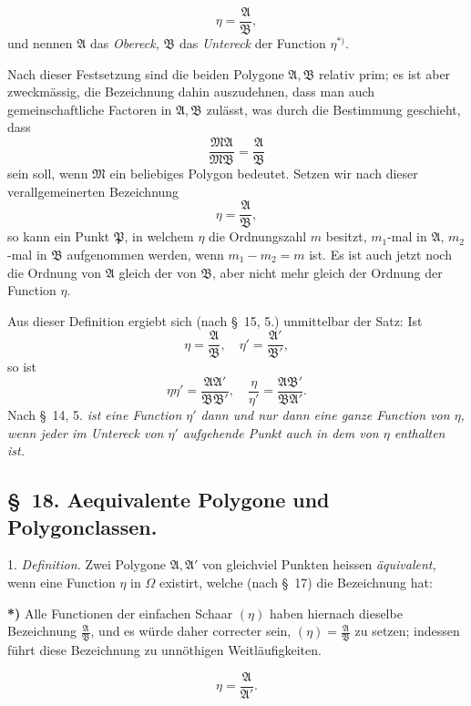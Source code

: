 \documentclass{article}
\begin{document}
\[ \eta = \frac{\mathfrak{A}}{\mathfrak{B}}, \]
und nennen $\mathfrak{A}$ das \emph{Obereck,} $\mathfrak{B}$ das \emph{Untereck} der Function $\eta{}^{*)}$.

Nach dieser Festsetzung sind die beiden Polygone $\mathfrak{A}, \mathfrak{B}$ relativ prim; es ist aber zweckmässig, die Bezeichnung dahin auszudehnen, dass man auch gemeinschaftliche Factoren in $\mathfrak{A}, \mathfrak{B}$ zulässt, was durch die Bestimmung geschieht, dass
\[ \frac{\mathfrak{M}\mathfrak{A}}{\mathfrak{M}\mathfrak{B}} = \frac{\mathfrak{A}}{\mathfrak{B}} \]
sein soll, wenn $\mathfrak{M}$ ein beliebiges Polygon bedeutet. Setzen wir nach dieser verallgemeinerten Bezeichnung
\[ \eta = \frac{\mathfrak{A}}{\mathfrak{B}}, \]
so kann ein Punkt $\mathfrak{P}$, in welchem $\eta$ die Ordnungszahl $m$ besitzt, $m_{1}$-mal in $\mathfrak{A}$, $m_{2}$-mal in $\mathfrak{B}$ aufgenommen werden, wenn $m_{1} - m_{2} = m$ ist. Es ist auch jetzt noch die Ordnung von $\mathfrak{A}$ gleich der von $\mathfrak{B}$, aber nicht mehr gleich der Ordnung der Function $\eta$.

Aus dieser Definition ergiebt sich (nach §~15, 5.) unmittelbar der Satz: Ist
\[ \eta = \frac{\mathfrak{A}}{\mathfrak{B}}, \quad \eta' = \frac{\mathfrak{A}'}{\mathfrak{B}'}, \]
so ist
\[ \eta\eta' = \frac{\mathfrak{A}\mathfrak{A}'}{\mathfrak{B}\mathfrak{B}'}, \quad \frac{\eta}{\eta'} = \frac{\mathfrak{A}\mathfrak{B}'}{\mathfrak{B}\mathfrak{A}'}. \]
Nach §~14, 5. \emph{ist eine Function $\eta'$ dann und nur dann eine ganze Function von $\eta$, wenn jeder im Untereck von $\eta'$ aufgehende Punkt auch in dem von $\eta$ enthalten ist.}

\subsection*{§~18. Aequivalente Polygone und Polygonclassen.}

1. \emph{Definition.} Zwei Polygone $\mathfrak{A}, \mathfrak{A}'$ von gleichviel Punkten heissen \emph{äquivalent,} wenn eine Function $\eta$ in $\Omega$ existirt, welche (nach §~17) die Bezeichnung hat:

\textbf{*)} Alle Functionen der einfachen Schaar $(\eta)$ haben hiernach dieselbe Bezeichnung $\frac{\mathfrak{A}}{\mathfrak{B}}$, und es würde daher correcter sein, $(\eta) = \frac{\mathfrak{A}}{\mathfrak{B}}$ zu setzen; indessen führt diese Bezeichnung zu unnöthigen Weitläufigkeiten.

\[ \eta = \frac{\mathfrak{A}}{\mathfrak{A}'}. \]
\end{document}
